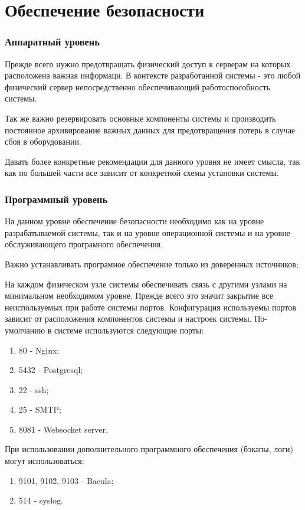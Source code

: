\section{Обеспечение безопасности}
\subsubsection{Аппаратный уровень}
Прежде всего нужно предотвращать физический доступ к серверам на которых
расположена важная информаци. В контексте разработанной системы - это любой
физический сервер непосредственно обеспечивающий работоспособность системы.

Так же важно резервировать основные компоненты системы и производить постоянное
архивирование важных данных для предотвращения потерь в случае сбоя в
оборудовании.

Давать более конкретные рекомендации для данного уровня не имеет смысла, так как
по большей части все зависит от конкретной схемы установки системы.

\subsubsection{Программный уровень}
На данном уровне обеспечение безопасности необходимо как на уровне
разрабатываемой системы, так и на уровне операционной системы и на уровне
обслуживающего програмного обеспечения.

Важно устанавливать програмное обеспечение только из доверенных источников;

На каждом физическом узле системы обеспечивать связь с другими узлами на
минимальном необходимом уровне. Прежде всего это значит закрытие все
неиспользуемых при работе системы портов. Конфигурация используемы портов
зависит от расположения компонентов системы и настроек системы. По-умолчанию в
системе используются следующие порты:
\begin{enumerate}
  \item 80 - Nginx;
  \item 5432 - Postgresql;
  \item 22 - ssh;
  \item 25 - SMTP;
  \item 8081 - Websocket server.   
\end{enumerate}

При использовании дополнительного программного обеспечения (бэкапы, логи) могут
использоваться:
\begin{enumerate}
  \item 9101, 9102, 9103 - Bacula;
  \item 514 - syslog.   
\end{enumerate}

